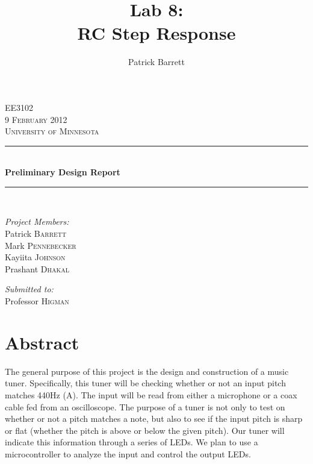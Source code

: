 \documentclass[12pt]{article}
\title{Lab 8:\\RC Step Response} %
\author{Patrick Barrett}
\date{}                                           %
\newcommand{\HRule}{\rule{\linewidth}{0.5mm}}
\begin{document}
\begin{singlespace}

\begin{center}
 
 

 
\textsc{\LARGE EE3102}\\[0.5cm]
 

\textsc{\Large 9 February 2012}\\[0.5cm]

\textsc{\Large University of Minnesota}\\[0.5cm]
 
 
\HRule \\[0.4cm]
{ \huge \bfseries Preliminary Design Report}\\[0.4cm]
 
\HRule \\[1cm]
 
\begin{minipage}{0.4\textwidth}
\begin{flushleft} \large
\emph{Project Members:}\\
Patrick \textsc{Barrett} \\
Mark \textsc{Pennebecker} \\
Kayiita  \textsc{Johnson} \\
Prashant \textsc{Dhakal} \\
\end{flushleft}
\end{minipage}
\begin{minipage}{0.4\textwidth}
\begin{flushright} \large
\emph{Submitted to:} \\
Professor \textsc{Higman}\\
\end{flushright}
\end{minipage}
\end{center}

\vfill

\section*{Abstract}
The general purpose of this project is the design and construction of a music tuner. Specifically, this
tuner will be checking whether or not an input pitch matches 440Hz (A). The input will be read from
either a microphone or a coax cable fed from an oscilloscope. The purpose of a tuner is not only to test
on whether or not a pitch matches a note, but also to see if the input pitch is sharp or flat (whether the
pitch is above or below the given pitch). Our tuner will indicate this information through a series of
LEDs. We plan to use a microcontroller to analyze the input and control the output LEDs.
\end{singlespace}
\end{document}
